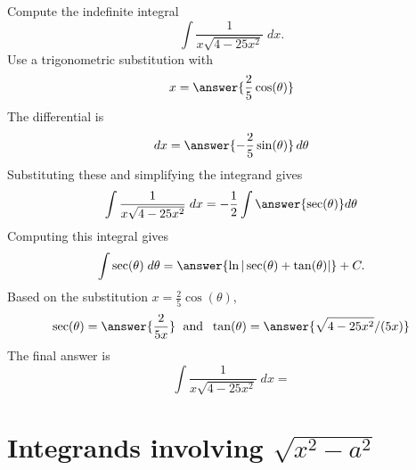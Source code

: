 \documentclass{ximera}
\begin{document}
\begin{problem}

Compute the indefinite integral
\[
\int \frac{1}{x\sqrt{4-25x^2}}  \; dx.
\]
Use a trigonometric substitution with\\
\[
x = \answer{\frac25\cos(\theta)}
\]
The differential is\\
\[
dx = \answer{-\frac25\sin(\theta)}\,d\theta
\]
Substituting these and simplifying the integrand gives\\
\[
\int \frac{1}{x\sqrt{4-25x^2}}  \; dx = -\frac12\int \answer{\sec(\theta)} d\theta
\]
Computing this integral gives
\[
\int \sec(\theta) \; d\theta = \answer{\ln|\sec(\theta) + \tan(\theta)|} + C.
\]
Based on the substitution $x = \frac25 \cos(\theta)$, \\
\[
\sec(\theta) = \answer{\frac{2}{5x}} \; \text{ and } \; \tan(\theta) = \answer{\sqrt{4-25x^2}/(5x)}
\]
The final answer is
\[
\int  \frac{1}{x\sqrt{4-25x^2}} \; dx = 
\]
\begin{center}
\begin{multipleChoice}
\end{multipleChoice}
\end{center}


\end{problem}

















\section{Integrands involving $\sqrt{x^2 - a^2}$}
\end{document}
